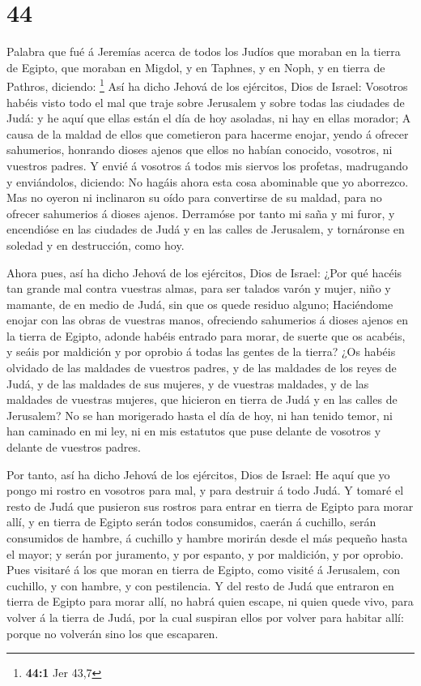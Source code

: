 \hypertarget{section-43}{%
\section{44}\label{section-43}}

 Palabra que fué á Jeremías acerca de todos los Judíos que
moraban en la tierra de Egipto, que moraban en Migdol, y en Taphnes, y
en Noph, y en tierra de Pathros, diciendo: \footnote{\textbf{44:1} Jer
  43,7}  Así ha dicho Jehová de los ejércitos, Dios de
Israel: Vosotros habéis visto todo el mal que traje sobre Jerusalem y
sobre todas las ciudades de Judá: y he aquí que ellas están el día de
hoy asoladas, ni hay en ellas morador;  A causa de la maldad
de ellos que cometieron para hacerme enojar, yendo á ofrecer sahumerios,
honrando dioses ajenos que ellos no habían conocido, vosotros, ni
vuestros padres.  Y envié á vosotros á todos mis siervos los
profetas, madrugando y enviándolos, diciendo: No hagáis ahora esta cosa
abominable que yo aborrezco.  Mas no oyeron ni inclinaron su
oído para convertirse de su maldad, para no ofrecer sahumerios á dioses
ajenos.  Derramóse por tanto mi saña y mi furor, y
encendióse en las ciudades de Judá y en las calles de Jerusalem, y
tornáronse en soledad y en destrucción, como hoy.

 Ahora pues, así ha dicho Jehová de los ejércitos, Dios de
Israel: ¿Por qué hacéis tan grande mal contra vuestras almas, para ser
talados varón y mujer, niño y mamante, de en medio de Judá, sin que os
quede residuo alguno;  Haciéndome enojar con las obras de
vuestras manos, ofreciendo sahumerios á dioses ajenos en la tierra de
Egipto, adonde habéis entrado para morar, de suerte que os acabéis, y
seáis por maldición y por oprobio á todas las gentes de la tierra?
 ¿Os habéis olvidado de las maldades de vuestros padres, y
de las maldades de los reyes de Judá, y de las maldades de sus mujeres,
y de vuestras maldades, y de las maldades de vuestras mujeres, que
hicieron en tierra de Judá y en las calles de Jerusalem? 
No se han morigerado hasta el día de hoy, ni han tenido temor, ni han
caminado en mi ley, ni en mis estatutos que puse delante de vosotros y
delante de vuestros padres.

 Por tanto, así ha dicho Jehová de los ejércitos, Dios de
Israel: He aquí que yo pongo mi rostro en vosotros para mal, y para
destruir á todo Judá.  Y tomaré el resto de Judá que
pusieron sus rostros para entrar en tierra de Egipto para morar allí, y
en tierra de Egipto serán todos consumidos, caerán á cuchillo, serán
consumidos de hambre, á cuchillo y hambre morirán desde el más pequeño
hasta el mayor; y serán por juramento, y por espanto, y por maldición, y
por oprobio.  Pues visitaré á los que moran en tierra de
Egipto, como visité á Jerusalem, con cuchillo, y con hambre, y con
pestilencia.  Y del resto de Judá que entraron en tierra de
Egipto para morar allí, no habrá quien escape, ni quien quede vivo, para
volver á la tierra de Judá, por la cual suspiran ellos por volver para
habitar allí: porque no volverán sino los que escaparen.


